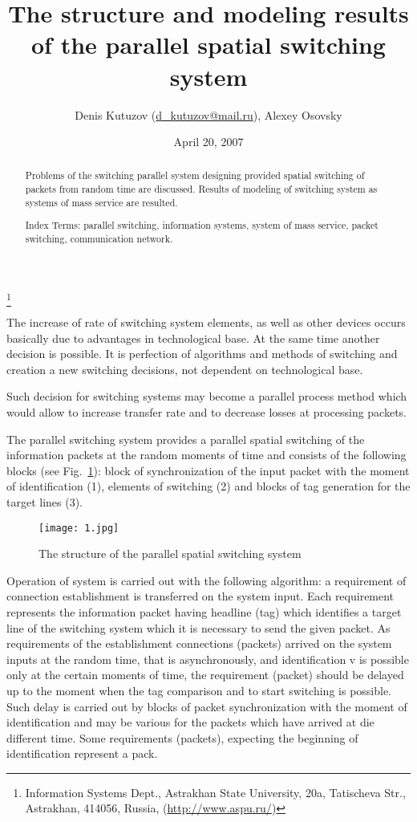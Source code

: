 \documentclass[10pt]{article}
\title{The structure and modeling results of the parallel spatial switching
system}
\author{Denis Kutuzov (\url{d_kutuzov@mail.ru}), Alexey Osovsky}
\date{April 20, 2007}
\begin{document}
\maketitle
\thanks{Information Systems Dept., Astrakhan State University, 20a,
Tatischeva Str., Astrakhan, 414056, Russia,
(\url{http://www.aspu.ru/})}


\begin{abstract}
Problems of the switching parallel system designing provided spatial
switching of packets from random time are discussed. Results of
modeling of switching system as systems of mass service are
resulted.

Index Terms: parallel switching, information systems, system of mass
service, packet switching, communication network.
\end{abstract}


The increase of rate of switching system elements, as well as other
devices occurs basically due to advantages in technological base. At
the same time another decision is possible. It is perfection of
algorithms and methods of switching and creation a new switching
decisions, not dependent on technological base.

Such decision for switching systems may become a parallel process
method which would allow to increase transfer rate and to decrease
losses at processing packets.

The parallel switching system \cite{Kutuzov} provides a parallel
spatial switching of the information packets at the random moments
of time and consists of the following blocks (see Fig.~\ref{fig1}):
block of synchronization of the input packet with the moment of
identification (1), elements of switching (2) and blocks of tag
generation for the target lines (3).

\begin{figure}[htbp]
\centerline{\texttt{[image: 1.jpg]}} \caption{The
structure of the parallel spatial switching system} \label{fig1}
\end{figure}

Operation of system is carried out with the following algorithm: a
requirement of connection establishment is transferred on the system
input. Each requirement represents the information packet having
headline (tag) which identifies a target line of the switching
system which it is necessary to send the given packet. As
requirements of the establishment connections (packets) arrived on
the system inputs at the random time, that is asynchronously, and
identification v is possible only at the certain moments of time,
the requirement (packet) should be delayed up to the moment when the
tag comparison and to start switching is possible. Such delay is
carried out by blocks of packet synchronization with the moment of
identification and may be various for the packets which have arrived
at die different time. Some requirements (packets), expecting the
beginning of identification represent a pack.
\end{document}
